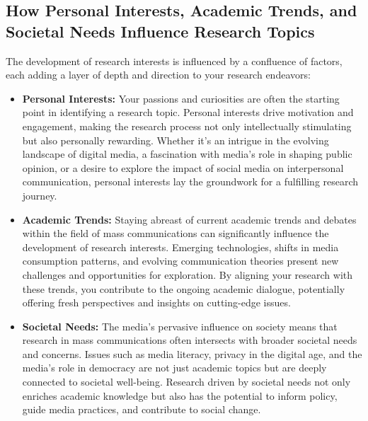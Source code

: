 \documentclass[
]{book}
\begin{document}
\hypertarget{how-personal-interests-academic-trends-and-societal-needs-influence-research-topics}{%
\subsection*{How Personal Interests, Academic Trends, and Societal Needs Influence Research Topics}\label{how-personal-interests-academic-trends-and-societal-needs-influence-research-topics}}

The development of research interests is influenced by a confluence of factors, each adding a layer of depth and direction to your research endeavors:

\begin{itemize}
\item
  \textbf{Personal Interests:} Your passions and curiosities are often the starting point in identifying a research topic. Personal interests drive motivation and engagement, making the research process not only intellectually stimulating but also personally rewarding. Whether it's an intrigue in the evolving landscape of digital media, a fascination with media's role in shaping public opinion, or a desire to explore the impact of social media on interpersonal communication, personal interests lay the groundwork for a fulfilling research journey.
\item
  \textbf{Academic Trends:} Staying abreast of current academic trends and debates within the field of mass communications can significantly influence the development of research interests. Emerging technologies, shifts in media consumption patterns, and evolving communication theories present new challenges and opportunities for exploration. By aligning your research with these trends, you contribute to the ongoing academic dialogue, potentially offering fresh perspectives and insights on cutting-edge issues.
\item
  \textbf{Societal Needs:} The media's pervasive influence on society means that research in mass communications often intersects with broader societal needs and concerns. Issues such as media literacy, privacy in the digital age, and the media's role in democracy are not just academic topics but are deeply connected to societal well-being. Research driven by societal needs not only enriches academic knowledge but also has the potential to inform policy, guide media practices, and contribute to social change.
\end{itemize}
\end{document}

